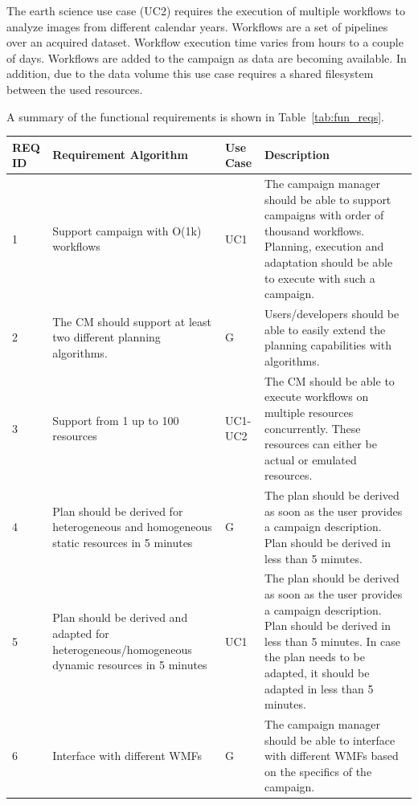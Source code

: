 The earth science use case (UC2) requires the execution of multiple workflows to analyze images from different calendar years.
Workflows are a set of pipelines over an acquired dataset.
Workflow execution time varies from hours to a couple of days.
Workflows are added to the campaign as data are becoming available.
In addition, due to the data volume this use case requires a shared filesystem between the used resources.

A summary of the functional requirements is shown in Table~\ref{tab:fun_reqs}.

\begin{table}[t]
    \centering
    \scriptsize
    \begin{tabular}{@{}p{1.5cm}|p{2.8cm}p{1.5cm}p{6cm}@{}}
        \toprule
        \textbf{REQ ID} &\textbf{Requirement Algorithm} &\textbf{Use Case} & \textbf{Description} \\
        \midrule
         1 & 
         Support campaign with O(1k) workflows & 
         UC1 & 
         The campaign manager should be able to support campaigns with order of thousand workflows.
         Planning, execution and adaptation should be able to execute with such a campaign.\\
         2 & 
         The CM should support at least two different planning algorithms. & 
         G & 
         Users/developers should be able to easily extend the planning capabilities with algorithms.\\
         3 & 
         Support from 1 up to 100 resources & 
         UC1-UC2 & 
         The CM should be able to execute workflows on multiple resources concurrently.
         These resources can either be actual or emulated resources.\\
         4 & 
         Plan should be derived for heterogeneous and homogeneous static resources in 5 minutes & 
         G & 
         The plan should be derived as soon as the user provides a campaign description. 
         Plan should be derived in less than 5 minutes.\\
         5 & 
         Plan should be derived and adapted for heterogeneous/homogeneous dynamic resources in 5 minutes & 
         UC1 & 
         The plan should be derived as soon as the user provides a campaign description.
         Plan should be derived in less than 5 minutes.
         In case the plan needs to be adapted, it should be adapted in less than 5 minutes.\\
         6 & 
         Interface with different WMFs & 
         G & 
         The campaign manager should be able to interface with different WMFs based on the specifics of the campaign. \\

\end{tabular}
\end{table}

